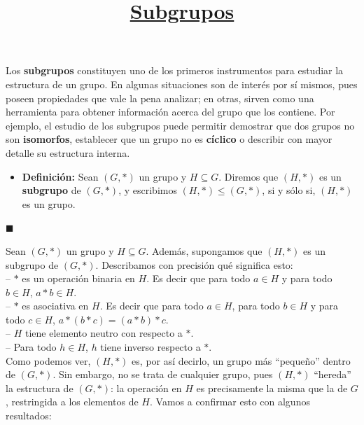 \documentclass[10 pt]{article}
\title{\textbf{\underline{Subgrupos}}}
\author{}
\date{}
\begin{document}
\pagestyle{empty}
\maketitle
\thispagestyle{empty}

\section*{}

\Large{Los \textbf{subgrupos} constituyen uno de los primeros instrumentos para estudiar la estructura de un grupo. En algunas situaciones son de interés por sí mismos, pues poseen propiedades que vale la pena analizar; en otras, sirven como una herramienta para obtener información acerca del grupo que los contiene. Por ejemplo, el estudio de los subgrupos puede permitir demostrar que dos grupos no son \textbf{isomorfos}, establecer que un grupo no es \textbf{cíclico} o describir con mayor detalle su estructura interna.} \\

\begin{itemize}
\item \Large{\textbf{Definición:} Sean $(G,*)$ un grupo y $H \subseteq G$. Diremos que $(H,*)$ es un \textbf{subgrupo} de $(G,*)$, y escribimos \underline{$(H,*) \leq (G,*)$}, si y sólo si, $(H,*)$ es un grupo.} \\
\end{itemize}

\begin{flushright} 
   $\blacksquare$
\end{flushright}

\Large{Sean $(G,*)$ un grupo y $H \subseteq G$. Además, supongamos que $(H,*)$ es un subgrupo de $(G,*)$. Describamos con precisión qué significa esto: \\

-- $*$ es un operación binaria en $H$. Es decir que para todo $a \in H$ y para todo $b \in H$, $a*b \in H$. \\

-- $*$ es asociativa en $H$. Es decir que para todo $a \in H$, para todo $b \in H$ y para todo $c \in H$, $a*(b*c)=(a*b)*c$. \\

-- $H$ tiene elemento neutro con respecto a $*$. \\

-- Para todo $h \in H$, $h$ tiene inverso respecto a $*$. \\

Como podemos ver, $(H,*)$ es, por así decirlo, un grupo más ``pequeño'' dentro de $(G,*)$. Sin embargo, no se trata de cualquier grupo, pues $(H,*)$ ``hereda'' la estructura de $(G,*)$: la operación en $H$ es precisamente la misma que la de $G$, restringida a los elementos de $H$. Vamos a confirmar esto con algunos resultados:} \\
\end{document}
